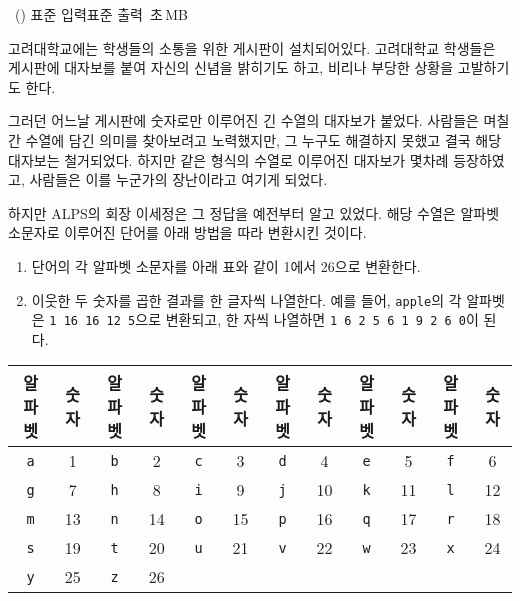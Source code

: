 \begin{problem}{\kcpcprobposter\ (\kcpcprobpostershort)}
    {표준 입력}{표준 출력}
    {\kcpcprobpostertime\,초}{\kcpcprobpostermemory\,MB}{}
    
    고려대학교에는 학생들의 소통을 위한 게시판이 설치되어있다. 고려대학교 학생들은 게시판에 대자보를 붙여 자신의 신념을 밝히기도 하고, 비리나 부당한 상황을 고발하기도 한다. 
    
    그러던 어느날 게시판에 숫자로만 이루어진 긴 수열의 대자보가 붙었다. 사람들은 며칠간 수열에 담긴 의미를 찾아보려고 노력했지만, 그 누구도 해결하지 못했고 결국 해당 대자보는 철거되었다. 하지만 같은 형식의 수열로 이루어진 대자보가 몇차례 등장하였고, 사람들은 이를 누군가의 장난이라고 여기게 되었다.
    
    하지만 ALPS의 회장 이세정은 그 정답을 예전부터 알고 있었다. 해당 수열은 알파벳 소문자로 이루어진 단어를 아래 방법을 따라 변환시킨 것이다.
    
    \begin{enumerate}
        \item 단어의 각 알파벳 소문자를 아래 표와 같이 1에서 26으로 변환한다.
        \item 이웃한 두 숫자를 곱한 결과를 한 글자씩 나열한다. 예를 들어, \texttt{apple}의 각 알파벳은 \texttt{1 16 16 12 5}으로 변환되고, 한 자씩 나열하면 \texttt{1 6 2 5 6 1 9 2 6 0}이 된다.
    \end{enumerate}
    
    \begin{table}[h]
        \centering
        \begin{tabular}{|cc|cc|cc|cc|cc|cc|}
            \hline
            알파벳 & 숫자 & 알파벳 & 숫자 & 알파벳 & 숫자 & 알파벳 & 숫자 & 알파벳 & 숫자 & 알파벳 & 숫자  \\ \hline \hline
            \texttt{a} & 1 &
            \texttt{b} & 2 &
            \texttt{c} & 3 &
            \texttt{d} & 4 &
            \texttt{e} & 5 &
            \texttt{f} & 6 \\ \hline
            \texttt{g} & 7 &
            \texttt{h} & 8 &
            \texttt{i} & 9 &
            \texttt{j} & 10 &
            \texttt{k} & 11 &
            \texttt{l} & 12 \\ \hline
            \texttt{m} & 13 &
            \texttt{n} & 14 &
            \texttt{o} & 15 &
            \texttt{p} & 16 &
            \texttt{q} & 17 &
            \texttt{r} & 18 \\ \hline
            \texttt{s} & 19 &
            \texttt{t} & 20 &
            \texttt{u} & 21 &
            \texttt{v} & 22 &
            \texttt{w} & 23 &
            \texttt{x} & 24 \\ \hline
            \texttt{y} & 25 &
            \texttt{z} & 26 &
            & & & & & & & \\ \hline
        \end{tabular}
    \end{table}
    

\end{problem}

